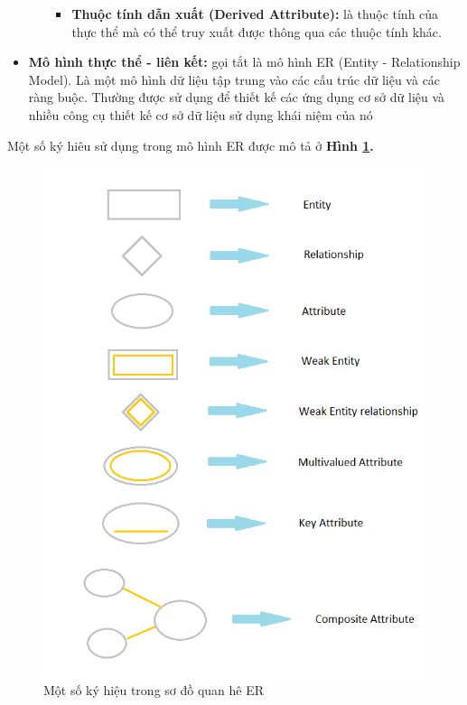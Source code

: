 \documentclass[12pt]{report}
\begin{document}
\begin{itemize}
\begin{itemize}
\begin{itemize}
						\item{\textbf{Thuộc tính dẫn xuất (Derived Attribute):}} là thuộc tính của thực thể mà có thể truy xuất được thông qua các thuộc tính khác.
					\end{itemize}					
				\end{itemize}
			\item{\textbf{Mô hình thực thể - liên kết:} gọi tắt là mô hình ER (Entity - Relationship Model). Là một mô hình dữ liệu tập trung vào các cấu trúc dữ liệu và các ràng buộc. Thường được sử dụng để thiết kế các ứng dụng cơ sở dữ liệu và nhiều công cụ thiết kế cơ sở dữ liệu sử dụng khái niệm của nó}
			\end{itemize}
			Một số ký hiêu sử dụng trong mô hình ER được mô tả ở \textbf{Hình \ref{fig:attributes}.}
					\begin{figure}
						\centering
						\includegraphics[scale=0.6]{images/ERsymbols.png}
						\caption[Một số ký hiệu trong sơ đồ quan hê ER]{Một số ký hiệu trong sơ đồ quan hê ER \protect\footnotemark{}}
						\label{fig:attributes}
					\end{figure}
\end{document}
